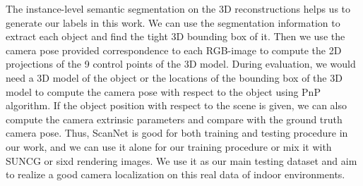 The instance-level semantic segmentation on the 3D reconstructions helps us to generate our labels in this work. We can use the segmentation information to extract each object and find the tight 3D bounding box of it. Then we use the camera pose provided correspondence to each RGB-image to compute the 2D projections of the 9 control points of the 3D model. During evaluation, we would need a 3D model of the object or the locations of the bounding box of the 3D model to compute the camera pose with respect to the object using PnP algorithm. If the object position with respect to the scene is given, we can also compute the camera extrinsic parameters and compare with the ground truth camera pose. Thus, ScanNet is good for both training and testing procedure in our work, and we can use it alone for our training procedure or mix it with SUNCG or sixd rendering images. We use it  as our main testing dataset and aim to realize a good camera localization on this real data of indoor environments.

